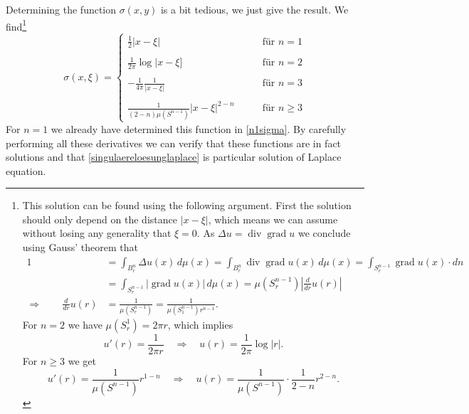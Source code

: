 Determining the function $\sigma(x,y)$ is a bit tedious, we just give the
result.
We find\footnote{%
This solution can be found using the following argument.
First the solution should only depend on the distance $|x-\xi|$, which
means we can assume without losing any generality that $\xi=0$.
As $\Delta u=\operatorname{div}\operatorname{grad}u$ we  conclude using
Gauss' theorem that
\begin{align*}
1&=\int_{B_r^n} \Delta u(x)\,d\mu(x)
=
\int_{B_r^n} \operatorname{div}\operatorname{grad} u(x)\,d\mu(x)
=\int_{S_r^{n-1}}\operatorname{grad}u(x)\cdot dn
\\
&=\int_{S_r^{n-1}}|\operatorname{grad}u(x)|\,d\mu(x)
=\mu(S_r^{n-1})\left|\frac{d}{dr}u(r)\right|
\\
\Rightarrow\qquad\frac{d}{dr}u(r)
&=\frac1{\mu(S_r^{n-1})}
=\frac1{\mu(S_1^{n-1})r^{n-1}}.
\end{align*}
For $n=2$ we have
$\mu(S_r^1)=2\pi r$, which implies
\[
u'(r)=\frac1{2\pi r}\quad\Rightarrow\quad u(r)=\frac1{2\pi}\log|r|.
\]
For $n\ge 3$ we get
\[
u'(r)=\frac1{\mu(S^{n-1})}r^{1-n}\quad\Rightarrow\quad u(r)=\frac1{\mu(S^{n-1})}\cdot \frac1{2-n}r^{2-n}.
\]
}
\begin{equation}
\sigma(x,\xi)=
\begin{cases}
\displaystyle \frac12|x-\xi|
&\qquad \text{für $n=1$}
\\
\\
\displaystyle \frac1{2\pi}\log|x-\xi]
&\qquad \text{für $n=2$}
\\
\\
\displaystyle -\frac1{4\pi}\frac1{|x-\xi|}
&\qquad \text{für $n= 3$}
\\
\\
\displaystyle \frac1{(2-n)\mu(S^{n-1})}|x-\xi|^{2-n}
&\qquad \text{für $n\ge 3$}
\end{cases}
\end{equation}
For $n=1$ we already have determined this function in \eqref{n1sigma}.
By carefully performing all these derivatives we can verify
that these functions are in fact solutions and that
\eqref{singulaereloesunglaplace} is particular solution of
Laplace equation.

